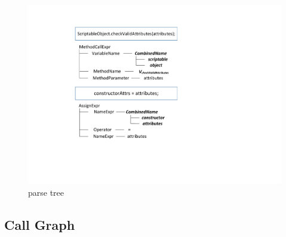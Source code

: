 
\begin{figure}[ht]
 \centering
 \includegraphics[width=0.6\linewidth]{img/newParseTree.pdf}
 \caption{\label{figure:parseTree2} parse tree}
\end{figure}


\subsection{Call Graph}




